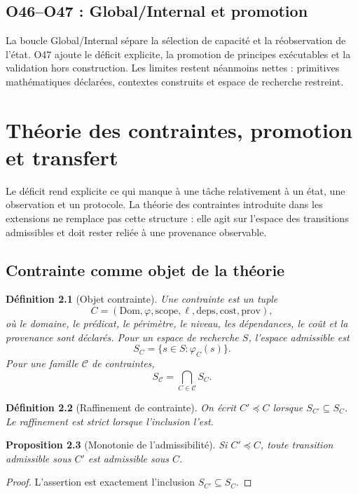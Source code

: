 \documentclass[11pt,a4paper,openany]{book}
\newtheorem{definition}{Définition}[chapter]
\newtheorem{proposition}[definition]{Proposition}
\begin{document}
\section{O46--O47 : Global/Internal et promotion}
La boucle Global/Internal sépare la sélection de capacité et la réobservation de l'état. O47 ajoute le déficit explicite, la promotion de principes exécutables et la validation hors construction. Les limites restent néanmoins nettes : primitives mathématiques déclarées, contextes construits et espace de recherche restreint.

\chapter{Théorie des contraintes, promotion et transfert}

Le déficit rend explicite ce qui manque à une tâche relativement à un état, une observation et un protocole. La théorie des contraintes introduite dans les extensions ne remplace pas cette structure : elle agit sur l'espace des transitions admissibles et doit rester reliée à une provenance observable.

\section{Contrainte comme objet de la théorie}
\begin{definition}[Objet contrainte]
Une contrainte est un tuple
\[
C=(\mathrm{Dom},\varphi,\mathrm{scope},\ell,\mathrm{deps},\mathrm{cost},\mathrm{prov}),
\]
où le domaine, le prédicat, le périmètre, le niveau, les dépendances, le coût et la provenance sont déclarés. Pour un espace de recherche $S$, l'espace admissible est
\[
S_C=\{s\in S: \varphi_C(s)\}.
\]
Pour une famille $\mathcal C$ de contraintes,
\[
S_{\mathcal C}=\bigcap_{C\in\mathcal C}S_C.
\]
\end{definition}

\begin{definition}[Raffinement de contrainte]
On écrit $C'\preceq C$ lorsque $S_{C'}\subseteq S_C$. Le raffinement est strict lorsque l'inclusion l'est.
\end{definition}

\begin{proposition}[Monotonie de l'admissibilité]
Si $C'\preceq C$, toute transition admissible sous $C'$ est admissible sous $C$.
\end{proposition}
\begin{proof}
L'assertion est exactement l'inclusion $S_{C'}\subseteq S_C$.
\end{proof}
\end{document}
